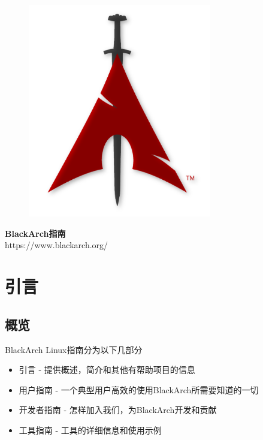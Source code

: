 \documentclass[a4paper, oneside, 11pt]{book}
\begin{document}
\pagestyle{empty}
\begin{center}
\begin{figure}[htbp]
\centering
\vspace{0.5cm}
\includegraphics[width=8cm]{images/logo.png}
\label{fig:logo}
\end{figure}
\vspace{0.5cm}
\Huge{\textbf{BlackArch指南}}\\
\vspace{1cm}
\Large{\color{red}https://www.blackarch.org/}\\
\vspace{0.5cm}
\end{center}
\newpage
\tableofcontents
\newpage
\pagestyle{fancy}


\chapter{引言}

\section{概览}
BlackArch Linux指南分为以下几部分
\begin{itemize}
\item 引言 - 提供概述，简介和其他有帮助项目的信息
\item 用户指南 - 一个典型用户高效的使用BlackArch所需要知道的一切
\item 开发者指南 - 怎样加入我们，为BlackArch开发和贡献
\item 工具指南 - 工具的详细信息和使用示例
\end{itemize}
\end{document}
